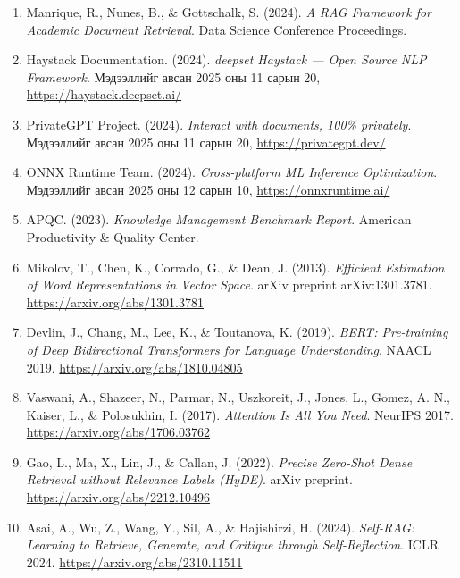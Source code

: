 \documentclass[11pt,a4paper]{article}
\begin{document}
\begin{enumerate}
    \item Manrique, R., Nunes, B., \& Gottschalk, S. (2024). \textit{A RAG Framework for
          Academic Document Retrieval}. Data Science Conference Proceedings.

    \item Haystack Documentation. (2024). \textit{deepset Haystack --- Open Source NLP
          Framework}. Мэдээллийг авсан 2025 оны 11 сарын 20,
          \url{https://haystack.deepset.ai/}

    \item PrivateGPT Project. (2024). \textit{Interact with documents, 100\% privately}.
          Мэдээллийг авсан 2025 оны 11 сарын 20, \url{https://privategpt.dev/}

    \item ONNX Runtime Team. (2024). \textit{Cross-platform ML Inference Optimization}.
          Мэдээллийг авсан 2025 оны 12 сарын 10,
          \url{https://onnxruntime.ai/}

    \item APQC. (2023). \textit{Knowledge Management Benchmark Report}. American Productivity
          \& Quality Center.

    \item Mikolov, T., Chen, K., Corrado, G., \& Dean, J. (2013). \textit{Efficient Estimation
          of Word Representations in Vector Space}. arXiv preprint arXiv:1301.3781.
          \url{https://arxiv.org/abs/1301.3781}

    \item Devlin, J., Chang, M., Lee, K., \& Toutanova, K. (2019). \textit{BERT: Pre-training
          of Deep Bidirectional Transformers for Language Understanding}. NAACL 2019.
          \url{https://arxiv.org/abs/1810.04805}

    \item Vaswani, A., Shazeer, N., Parmar, N., Uszkoreit, J., Jones, L., Gomez, A. N.,
          Kaiser, L., \& Polosukhin, I. (2017). \textit{Attention Is All You Need}.
          NeurIPS 2017. \url{https://arxiv.org/abs/1706.03762}

    \item Gao, L., Ma, X., Lin, J., \& Callan, J. (2022). \textit{Precise Zero-Shot Dense
          Retrieval without Relevance Labels (HyDE)}. arXiv preprint.
          \url{https://arxiv.org/abs/2212.10496}

    \item Asai, A., Wu, Z., Wang, Y., Sil, A., \& Hajishirzi, H. (2024).
          \textit{Self-RAG: Learning to Retrieve, Generate, and Critique through
          Self-Reflection}. ICLR 2024. \url{https://arxiv.org/abs/2310.11511}


\end{enumerate}
\end{document}
